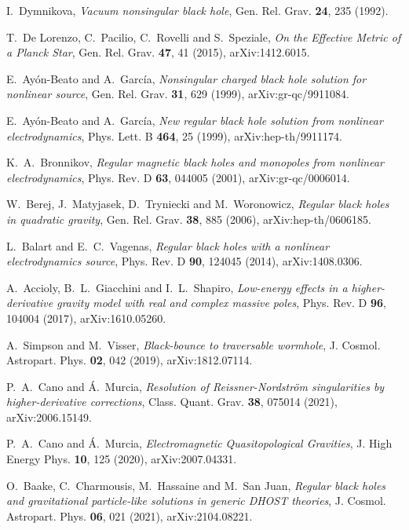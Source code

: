 \documentclass[aps,prd,a4paper,twocolumn,showpacs,showkeys,preprintnumbers,amsmath,amssymb,nofootinbib,usenames,dvipsnames]{revtex4-2}
\begin{document}
\begin{thebibliography}{99}
I.~Dymnikova,
{\it Vacuum nonsingular black hole},
Gen. Rel. Grav. \textbf{24}, 235 (1992).

T.~De Lorenzo, C.~Pacilio, C.~Rovelli and S.~Speziale,
{\it On the Effective Metric of a Planck Star},
Gen. Rel. Grav. \textbf{47}, 41 (2015),
arXiv:1412.6015.

E.~Ay\'on-Beato and A.~Garc\'ia,
{\it Nonsingular charged black hole solution for nonlinear source},
Gen. Rel. Grav. \textbf{31}, 629 (1999),
arXiv:gr-qc/9911084.

E.~Ay\'on-Beato and A.~Garc\'ia,
{\it New regular black hole solution from nonlinear electrodynamics},
Phys. Lett. B \textbf{464}, 25 (1999),
arXiv:hep-th/9911174.

K.~A.~Bronnikov,
{\it Regular magnetic black holes and monopoles from nonlinear electrodynamics},
Phys. Rev. D \textbf{63}, 044005 (2001),
arXiv:gr-qc/0006014.

W.~Berej, J.~Matyjasek, D.~Tryniecki and M.~Woronowicz,
{\it Regular black holes in quadratic gravity},
Gen. Rel. Grav. \textbf{38}, 885 (2006),
arXiv:hep-th/0606185.

L.~Balart and E.~C.~Vagenas,
{\it Regular black holes with a nonlinear electrodynamics source},
Phys. Rev. D \textbf{90}, 124045 (2014),
arXiv:1408.0306.

A.~Accioly, B.~L.~Giacchini and I.~L.~Shapiro,
{\it Low-energy effects in a higher-derivative gravity model with real and complex massive poles},
Phys. Rev. D \textbf{96}, 104004 (2017),
arXiv:1610.05260.

A.~Simpson and M.~Visser,
{\it Black-bounce to traversable wormhole},
J. Cosmol. Astropart. Phys. \textbf{02}, 042 (2019),
arXiv:1812.07114.

P.~A.~Cano and \'A.~Murcia,
{\it Resolution of Reissner-Nordstr\"om singularities by higher-derivative corrections},
Class. Quant. Grav. \textbf{38}, 075014 (2021),
arXiv:2006.15149.

P.~A.~Cano and \'A.~Murcia,
{\it Electromagnetic Quasitopological Gravities},
J. High Energy Phys. \textbf{10}, 125 (2020),
arXiv:2007.04331.

O.~Baake, C.~Charmousis, M.~Hassaine and M.~San Juan,
{\it Regular black holes and gravitational particle-like solutions in generic DHOST theories},
J. Cosmol. Astropart. Phys. \textbf{06}, 021 (2021),
arXiv:2104.08221.



\end{thebibliography}
\end{document}
